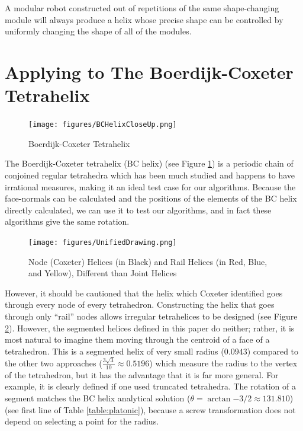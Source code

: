 \documentclass[11pt]{article}
\begin{document}
{A modular robot constructed out of repetitions of the same shape-changing module will always
produce a helix
whose precise shape can be controlled by uniformly changing the shape of all of the modules.


\section{Applying to The Boerdijk-Coxeter Tetrahelix}

\begin{figure}
     \centering
     \texttt{[image: figures/BCHelixCloseUp.png]}
     \caption{Boerdijk-Coxeter Tetrahelix}
  \label{fig:bchelix}
\end{figure}

The Boerdijk-Coxeter tetrahelix (BC helix) (see Figure \ref{fig:bchelix}) is a periodic chain of conjoined regular tetrahedra
which has been much studied\cite{coxeter1985simplicial,sadler2013periodic,fuller1982synergetics,read2018transforming}
and happens to have irrational measures, making it an ideal
test case for our algorithms. Because the face-normals can be calculated and the
positions of the elements of the BC helix directly calculated, we can use
it to test our algorithms, and in fact these algorithms give the same rotation.


\begin{figure}
     \centering
     \texttt{[image: figures/UnifiedDrawing.png]}
     \caption{Node (Coxeter) Helices (in Black) and Rail Helices (in Red, Blue, and Yellow), Different than Joint Helices}
  \label{fig:helixnodes}
\end{figure}

However, it should be cautioned that the helix which Coxeter identified\cite{coxeter1985simplicial} goes through every node of every tetrahedron. Constructing the helix that goes
through only ``rail'' nodes allows irregular tetrahelices to be designed\cite{read2018transforming} (see Figure \ref{fig:helixnodes}).
However, the segmented helices defined in this paper do neither; rather, it is most natural to
imagine them moving through the centroid of a face of a tetrahedron.
This is a segmented helix of
very small radius ($0.0943$) compared to the other two approaches
($\frac{3\sqrt{3}}{10} \approx 0.5196$) which measure the radius to the
vertex of the tetrahedron, but it has
the advantage that it is far more general. For example, it is
clearly defined if one used truncated tetrahedra.
The rotation of a
segment matches the BC helix analytical solution
($\theta = \arctan{-3/2} \approx 131.810$) (see first line of Table \ref{table:platonic}),
because a screw transformation does not depend on selecting a point for the radius.

}
\end{document}
